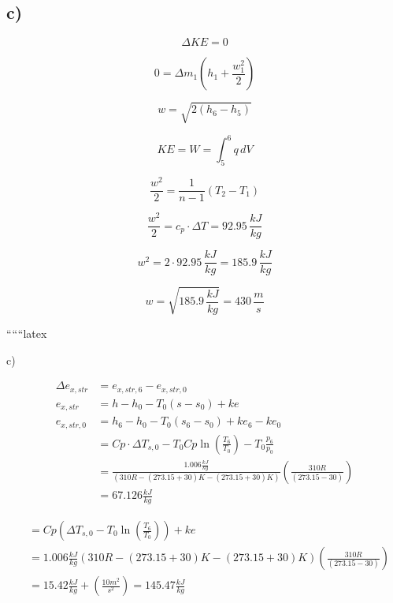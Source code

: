 

\subsection*{c)}

\[
\Delta KE = 0
\]

\[
0 = \Delta m_1 \left( h_1 + \frac{w_1^2}{2} \right)
\]

\[
w = \sqrt{2 \left( h_6 - h_5 \right)}
\]

\[
KE = W = \int_5^6 q \, dV
\]

\[
\frac{w^2}{2} = \frac{1}{n-1} \left( T_2 - T_1 \right)
\]

\[
\frac{w^2}{2} = c_p \cdot \Delta T = 92.95 \, \frac{kJ}{kg}
\]

\[
w^2 = 2 \cdot 92.95 \, \frac{kJ}{kg} = 185.9 \, \frac{kJ}{kg}
\]

\[
w = \sqrt{185.9 \, \frac{kJ}{kg}} = 430 \, \frac{m}{s}
\]

``````latex

c)

\begin{align*}
\Delta e_{x,str} &= e_{x,str,6} - e_{x,str,0} \\
e_{x,str} &= h - h_0 - T_0(s - s_0) + ke \\
e_{x,str,0} &= h_6 - h_0 - T_0(s_6 - s_0) + ke_6 - ke_0 \\
&= Cp \cdot \Delta T_{s,0} - T_0 Cp \ln \left( \frac{T_6}{T_0} \right) - T_0 \frac{p_6}{p_0} \\
&= \frac{1.006 \frac{kJ}{kg}}{(310R - (273.15 + 30)K - (273.15 + 30)K)} \left( \frac{310R}{(273.15 - 30)} \right) \\
&= 67.126 \frac{kJ}{kg}
\end{align*}

\begin{align*}
&= Cp \left( \Delta T_{s,0} - T_0 \ln \left( \frac{T_6}{T_0} \right) \right) + ke \\
&= 1.006 \frac{kJ}{kg} \left( 310R - (273.15 + 30)K - (273.15 + 30)K \right) \left( \frac{310R}{(273.15 - 30)} \right) \\
&= 15.42 \frac{kJ}{kg} + \left( \frac{10 m^2}{s^2} \right) = 145.47 \frac{kJ}{kg}
\end{align*}